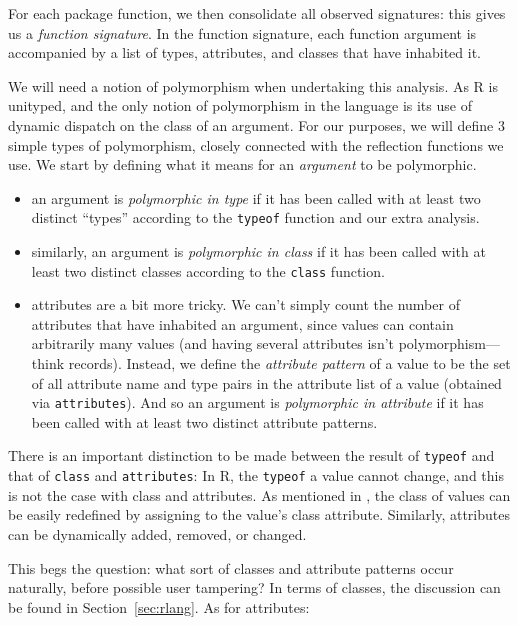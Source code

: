 \documentclass[acmsmall,10pt,review,anonymous]{acmart}\settopmatter{printfolios=true,printccs=false,printacmref=false}
\newcommand{\code}[1]{\lstinline|#1|\xspace}
\begin{document}
For each package function, we then consolidate all observed signatures: this gives us a {\it function signature}.
In the function signature, each function argument is accompanied by a list of types, attributes, and classes that have inhabited it. 

We will need a notion of polymorphism when undertaking this analysis.
As R is unityped, and the only notion of polymorphism in the language is its use of dynamic dispatch on the class of an argument.
For our purposes, we will define 3 simple types of polymorphism, closely connected with the reflection functions we use.
We start by defining what it means for an {\it argument} to be polymorphic.

\begin{itemize}

	\item an argument is {\it polymorphic in type} if it has been called with at least two distinct ``types'' according to the \code{typeof} function and our extra analysis.
	
	\item similarly, an argument is {\it polymorphic in class} if it has been called with at least two distinct classes according to the \code{class} function.
	
	\item attributes are a bit more tricky.
	We can't simply count the number of attributes that have inhabited an argument, since values can contain arbitrarily many values (and having several attributes isn't polymorphism---think records).
	Instead, we define the {\it attribute pattern} of a value to be the set of all attribute name and type pairs in the attribute list of a value (obtained via \code{attributes}).
	And so an argument is {\it polymorphic in attribute} if it has been called with at least two distinct attribute patterns.

\end{itemize}

There is an important distinction to be made between the result of \code{typeof} and that of \code{class} and \code{attributes}:
In R, the \code{typeof} a value cannot change, and this is not the case with class and attributes.
As mentioned in , the class of values can be easily redefined by assigning to the value's class attribute.
Similarly, attributes can be dynamically added, removed, or changed.

This begs the question: what sort of classes and attribute patterns occur naturally, before possible user tampering?
In terms of classes, the discussion can be found in Section~\ref{sec:rlang}.
As for attributes:
\end{document}
